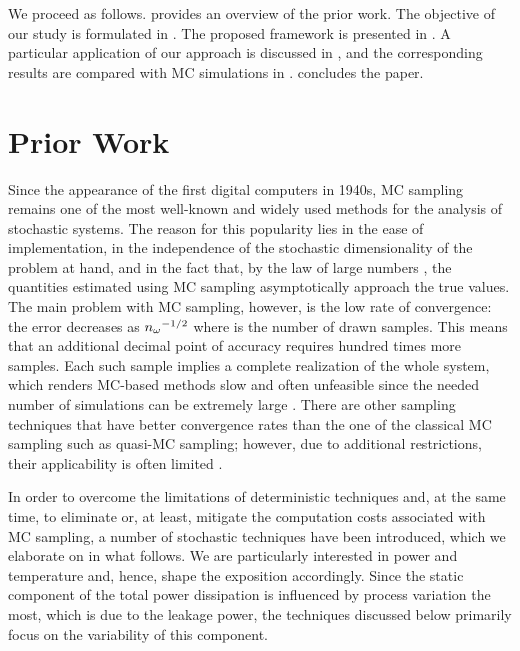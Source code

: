 We proceed as follows.  provides an overview of the prior
work. The objective of our study is formulated in . The
proposed framework is presented in . A particular
application of our approach is discussed in , and the
corresponding results are compared with \ac{MC} simulations in
.  concludes the paper.

\section{Prior Work}

Since the appearance of the first digital computers in 1940s, \acf{MC} sampling
remains one of the most well-known and widely used methods for the analysis of
stochastic systems. The reason for this popularity lies in the ease of
implementation, in the independence of the stochastic dimensionality of the
problem at hand, and in the fact that, by the law of large numbers
\cite{durrett2010}, the quantities estimated using \ac{MC} sampling
asymptotically approach the true values. The main problem with \ac{MC} sampling,
however, is the low rate of convergence: the error decreases as ${n_\mathrm{\omega}}^{-1/2}$
where \no is the number of drawn samples. This means that an additional decimal
point of accuracy requires hundred times more samples. Each such sample implies
a complete realization of the whole system, which renders \ac{MC}-based methods
slow and often unfeasible since the needed number of simulations can be
extremely large \cite{diaz-emparanza2002}. There are other sampling techniques
that have better convergence rates than the one of the classical \ac{MC}
sampling such as quasi-\ac{MC} sampling; however, due to additional
restrictions, their applicability is often limited \cite{xiu2010}.

In order to overcome the limitations of deterministic techniques and, at the
same time, to eliminate or, at least, mitigate the computation costs associated
with \ac{MC} sampling, a number of stochastic techniques have been introduced,
which we elaborate on in what follows. We are particularly interested in power
and temperature and, hence, shape the exposition accordingly. Since the static
component of the total power dissipation is influenced by process variation the
most, which is due to the leakage power, the techniques discussed below
primarily focus on the variability of this component.

